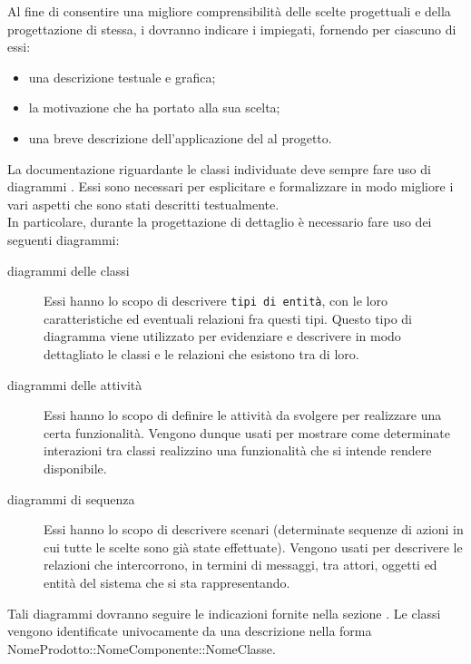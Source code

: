 					 \label{sec:ProgDetDesingPattern}
					Al fine di consentire una migliore comprensibilità  delle scelte progettuali e della progettazione di stessa, i  dovranno indicare i  impiegati, fornendo per ciascuno di essi:
					\begin{itemize}
						\item una descrizione testuale e grafica;
						\item la motivazione che ha portato alla sua scelta;
						\item una breve descrizione dell'applicazione del  al progetto.
					\end{itemize}
					 \label{sec:ProgDetUML}
					La documentazione riguardante le classi individuate deve sempre fare uso di diagrammi . Essi sono necessari per esplicitare e formalizzare in modo migliore i vari aspetti che sono stati descritti testualmente.\\
					In particolare, durante la progettazione di dettaglio è necessario fare uso dei seguenti diagrammi:
					\begin{description}
						\item[diagrammi delle classi] Essi hanno lo scopo di descrivere \texttt{tipi di entità}, con le loro caratteristiche ed eventuali relazioni fra questi tipi. Questo tipo di diagramma viene utilizzato per evidenziare e descrivere in modo dettagliato le classi e le relazioni che esistono tra di loro.
						\item[diagrammi delle attività] Essi hanno lo scopo di definire le attività da svolgere per realizzare una certa funzionalità. Vengono dunque usati per mostrare come determinate interazioni tra classi realizzino una funzionalità che si intende rendere disponibile.
						\item[diagrammi di sequenza] Essi hanno lo scopo di descrivere scenari (determinate sequenze di azioni in cui tutte le scelte sono già state effettuate). Vengono usati per descrivere le relazioni che intercorrono, in termini di messaggi, tra attori, oggetti ed entità del sistema che si sta rappresentando.
					\end{description}
					Tali diagrammi dovranno seguire le indicazioni fornite nella sezione .
					 \label{sec:ClassificareClassi}
					Le classi vengono identificate univocamente da una descrizione nella forma\\ NomeProdotto::NomeComponente::NomeClasse.
